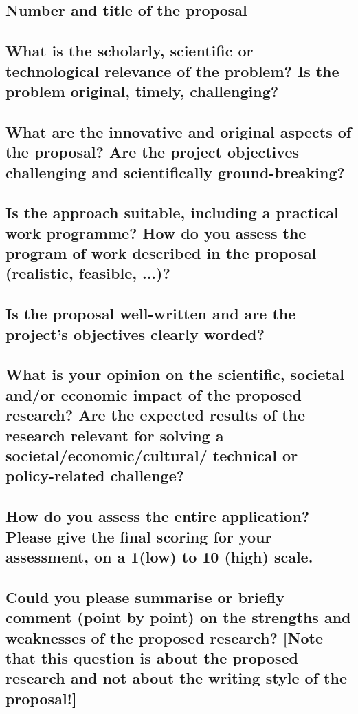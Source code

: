 \subsection*{Number and title of the proposal}

\subsection*{What is the scholarly, scientific or technological relevance of the problem? Is the problem original, timely, challenging?}

\subsection*{What are the innovative and original aspects of the proposal? Are the project objectives challenging and scientifically ground-breaking?}

\subsection*{Is the approach suitable, including a practical work programme? How do you assess the program of work described in the proposal (realistic, feasible, ...)?}

\subsection*{Is the proposal well-written and are the project’s objectives clearly worded?}

\subsection*{What is your opinion on the scientific, societal and/or economic impact of the proposed research? Are the expected results of the research relevant for solving a societal/economic/cultural/ technical or policy-related challenge?}

\subsection*{How do you assess the entire application? Please give the final scoring for your assessment, on a 1(low) to 10 (high) scale.}

\subsection*{Could you please summarise or briefly comment (point by point) on the strengths and weaknesses of the proposed research? [Note that this question is about the proposed research and not about the writing style of the proposal!]}

